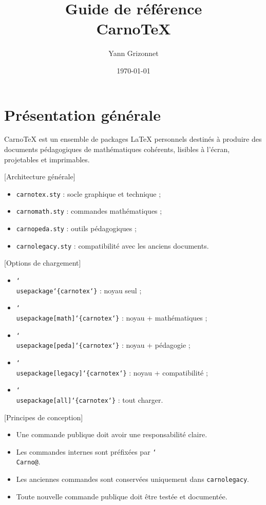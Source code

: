 \documentclass[a4paper,11pt]{article}
\title{Guide de référence\\\Large CarnoTeX}
\author{Yann Grizonnet}
\date{\today}
\newcommand{\pkg}[1]{\texttt{#1}}
\newcommand{\cmd}[1]{\texttt{\char`\\#1}}
\newcommand{\argu}[1]{\texttt{\char`\{#1\char`\}}}
\newcommand{\opt}[1]{\texttt{[#1]}}
\begin{document}
\maketitle
\tableofcontents
\newpage

\section{Présentation générale}

CarnoTeX est un ensemble de packages LaTeX personnels destinés à produire des documents pédagogiques de mathématiques cohérents, lisibles à l'écran, projetables et imprimables.

[Architecture générale]{
\begin{itemize}
  \item \pkg{carnotex.sty} : socle graphique et technique ;
  \item \pkg{carnomath.sty} : commandes mathématiques ;
  \item \pkg{carnopeda.sty} : outils pédagogiques ;
  \item \pkg{carnolegacy.sty} : compatibilité avec les anciens documents.
\end{itemize}
}

[Options de chargement]{
\begin{itemize}
  \item \cmd{usepackage}\argu{carnotex} : noyau seul ;
  \item \cmd{usepackage}\opt{math}\argu{carnotex} : noyau + mathématiques ;
  \item \cmd{usepackage}\opt{peda}\argu{carnotex} : noyau + pédagogie ;
  \item \cmd{usepackage}\opt{legacy}\argu{carnotex} : noyau + compatibilité ;
  \item \cmd{usepackage}\opt{all}\argu{carnotex} : tout charger.
\end{itemize}
}

[Principes de conception]{
\begin{itemize}
  \item Une commande publique doit avoir une responsabilité claire.
  \item Les commandes internes sont préfixées par \cmd{Carno@}.
  \item Les anciennes commandes sont conservées uniquement dans \pkg{carnolegacy}.
  \item Toute nouvelle commande publique doit être testée et documentée.
\end{itemize}
}
\end{document}
